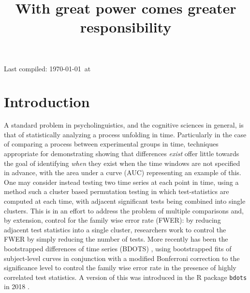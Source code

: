 \documentclass{article}
\title{With great power comes greater responsibility}
\date{}
\newcommand{\xt}{\texttt}
\begin{document}

\maketitle

Last compiled: \today \  at \currenttime

%


\section{Introduction}

A standard problem in psycholinguistics, and the cognitive sciences in general, is that of statistically analyzing a process unfolding in time. Particularly in the case of comparing a process between experimental groups in time, techniques appropriate for demonstrating showing that differences \textit{exist} offer little towards the goal of identifying \textit{when} they exist when the time windows are not specified in advance, with the area under a curve (AUC) representing an example of this. One may consider instead testing two time series at each point in time, using a method such a cluster based permutation testing \cite{Maris2007} in which test-statistics are computed at each time, with adjacent significant tests being combined into single clusters. This is in an effort to address the problem of multiple comparisons and, by extension, control for the family wise error rate (FWER): by reducing adjacent test statistics into a single cluster, researchers work to control the FWER by simply reducing the number of tests. More recently has been the bootstrapped differences of time series (BDOTS) \cite{oleson2017detecting}, using bootstrapped fits of subject-level curves in conjunction with a modified Bonferroni correction to the significance level to control the family wise error rate in the presence of highly correlated test statistics. A version of this was introduced in the R package \xt{bdots} in 2018 \cite{seedorff2018bdots}.
\end{document}
